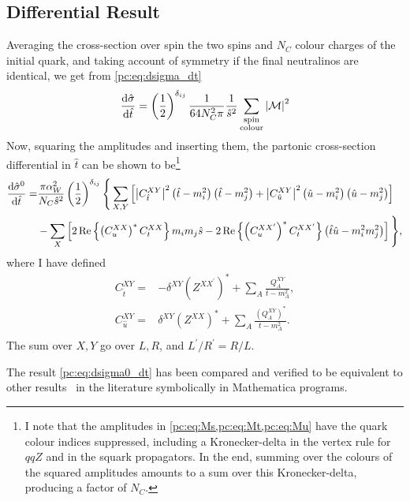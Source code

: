 \documentclass[../main.tex]{subfiles}
\begin{document}
\subsection{Differential Result}
Averaging the cross-section over spin the two spins and \(N_C\) colour charges of the initial quark, and taking account of symmetry if the final neutralinos are identical, we get from \cref{pc:eq:dsigma_dt}
\begin{equation}
  \label{pc:eq:dxsec}
  \d[\hat{t}]{\hat{\sigma}} = \pclosed{\frac{1}{2}}^{\delta_{ij}} \frac{1}{64 N_C^2 \pi} \frac{1}{\hat{s}^2} \sum_{\substack{\text{spin}\\\text{colour}}} \abs{\M}^2
\end{equation}
Now, squaring the amplitudes and inserting them, the partonic cross-section differential in \(\hat{t}\) can be shown to be\footnote{I note that the amplitudes in \cref{pc:eq:Ms,pc:eq:Mt,pc:eq:Mu} have the quark colour indices suppressed, including a Kronecker-delta in the vertex rule for \(qqZ\) and in the squark propagators. In the end, summing over the colours of the squared amplitudes amounts to a sum over this Kronecker-delta, producing a factor of \(N_C\).}
\begin{align}
  \label{pc:eq:dsigma0_dt}
  \nonumber
  \d[\hat{t}]{\hat{\sigma}^0} = & \frac{\pi \alpha_W^2}{N_C \hat{s}^2}
  \pclosed{\frac{1}{2}}^{\delta_{ij}} \Bigg\{ \sum_{X,Y}
  \bclosed{\abs{C^{XY}_{\hat{t}}}^2
    \pclosed{\hat{t}-m_i^2}\pclosed{\hat{t}-m_j^2} +
    \abs{C^{XY}_{\hat{u}}}^2
  \pclosed{\hat{u}-m_i^2}\pclosed{\hat{u}-m_j^2}}                      \\
                                & - \sum_X
  \bclosed{2\Re{\pclosed{C_{u}^{XX}}^\ast C_{t}^{XX}} m_i m_j \hat{s} -
    2\Re{\pclosed{C_{u}^{XX^\prime}}^\ast C_{t}^{XX^\prime}}
    \pclosed{\hat{t}\hat{u} - m_i^2m_j^2}} \Bigg\},
\end{align}
where I have defined
\begin{subequations}
  \begin{align}
    C_{\hat{t}}^{XY} = & -\delta^{XY} (Z^{XX^\prime})^\ast + \sum_{A}\frac{Q_A^{XY}}{t-m_A^2}, \\
    C_{\hat{u}}^{XY} = & \delta^{XY} (Z^{XX})^\ast + \sum_{A}\frac{(Q_A^{XY})^\ast}{t-m_A^2}.  \\
  \end{align}
\end{subequations}
The sum over \(X, Y\) go over \(L, R\), and \(L^\prime/R^\prime = R/L\).

The result \cref{pc:eq:dsigma0_dt} has been compared and verified to be equivalent to other results~\cite{Debove:2010kf} in the literature symbolically in Mathematica programs.
\end{document}
